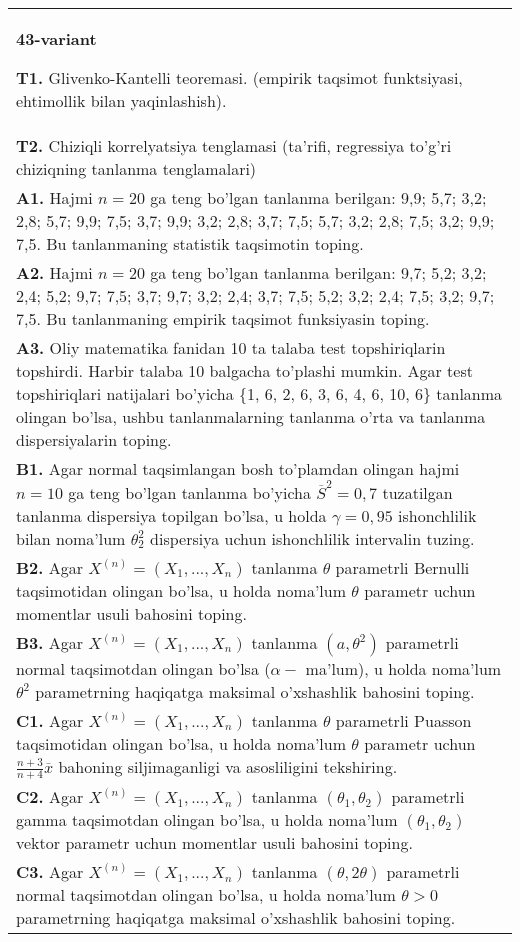 \documentclass{article}
\begin{document}
\begin{tabular}{m{17cm}}
\textbf{43-variant}
\newline

\textbf{T1.} 
Glivenko-Kantelli teoremasi. (empirik taqsimot funktsiyasi, ehtimollik bilan yaqinlashish).
\\
\textbf{T2.} 
Chiziqli korrelyatsiya tenglamasi (ta'rifi, regressiya to'g'ri chiziqning tanlanma tenglamalari)
\\
\textbf{A1.} 
Hajmi \(n = 20\) ga teng bo'lgan tanlanma berilgan: 9,9; 5,7; 3,2; 2,8; 5,7; 9,9; 7,5; 3,7; 9,9; 3,2; 2,8; 3,7; 7,5; 5,7; 3,2; 2,8; 7,5; 3,2; 9,9; 7,5. Bu tanlanmaning statistik taqsimotin toping.
\\
\textbf{A2.} 
Hajmi \(n = 20\) ga teng bo'lgan tanlanma berilgan: 9,7; 5,2; 3,2; 2,4; 5,2; 9,7; 7,5; 3,7; 9,7; 3,2; 2,4; 3,7; 7,5; 5,2; 3,2; 2,4; 7,5; 3,2; 9,7; 7,5. Bu tanlanmaning empirik taqsimot funksiyasin toping.
\\
\textbf{A3.} 
Oliy matematika fanidan 10 ta talaba test topshiriqlarin topshirdi. Harbir talaba 10 balgacha to'plashi mumkin. Agar test topshiriqlari natijalari bo'yicha \{1, 6, 2, 6, 3, 6, 4, 6, 10, 6\} tanlanma olingan bo'lsa, ushbu tanlanmalarning tanlanma o'rta va tanlanma dispersiyalarin toping.
\\
\textbf{B1.} 
Agar normal taqsimlangan bosh to'plamdan olingan hajmi \(n = 10\) ga teng bo'lgan tanlanma bo'yicha \({\overline{S}}^{2} = 0,7\) tuzatilgan tanlanma dispersiya topilgan bo'lsa, u holda \(\gamma = 0,95\) ishonchlilik bilan noma'lum \(\theta_{2}^{2}\) dispersiya uchun ishonchlilik intervalin tuzing.
\\
\textbf{B2.} 
Agar \(X^{(n)} = \left( X_{1},...,X_{n} \right)\) tanlanma \(\theta\) parametrli Bernulli taqsimotidan olingan bo'lsa, u holda noma'lum \(\theta\) parametr uchun momentlar usuli bahosini toping.
\\
\textbf{B3.} 
Agar \(X^{(n)} = \left( X_{1},...,X_{n} \right)\) tanlanma \(\left( a,\theta^{2} \right)\) parametrli normal taqsimotdan olingan bo'lsa (\(\alpha -\) ma'lum), u holda noma'lum \(\theta^{2}\) parametrning haqiqatga maksimal o'xshashlik bahosini toping.
\\
\textbf{C1.} 
Agar \(X^{(n)} = \left( X_{1},...,X_{n} \right)\) tanlanma \(\theta\) parametrli Puasson taqsimotidan olingan bo'lsa, u holda noma'lum \(\theta\) parametr uchun \(\frac{n + 3}{n + 4}\overline{x}\) bahoning siljimaganligi va asosliligini tekshiring.
\\
\textbf{C2.} 
Agar \(X^{(n)} = \left( X_{1},...,X_{n} \right)\) tanlanma \(\left( \theta_{1},\theta_{2} \right)\) parametrli gamma taqsimotdan olingan bo'lsa, u holda noma'lum \(\left( \theta_{1},\theta_{2} \right)\) vektor parametr uchun momentlar usuli bahosini toping.
\\
\textbf{C3.} 
Agar \(X^{(n)} = \left( X_{1},...,X_{n} \right)\) tanlanma \((\theta,2\theta)\) parametrli normal taqsimotdan olingan bo'lsa, u holda noma'lum \(\theta > 0\) parametrning haqiqatga maksimal o'xshashlik bahosini toping.
\\

\end{tabular}
\vspace{1cm}
\end{document}
